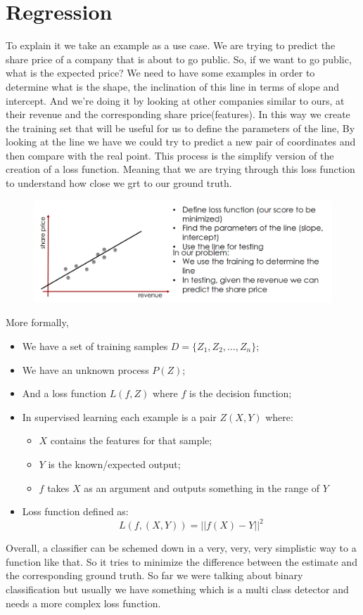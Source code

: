\section{Regression}
To explain it we take an example as a use case. We are trying to predict the share price of a company that is about to go public.
So, if we want to go public, what is the expected price? We need to have some examples in order to determine what is the shape, the inclination of this line in terms of slope and intercept.
And we're doing it by looking at other companies similar to ours, at their revenue and the corresponding share price(features).
In this way we create the training set that will be useful for us to define the parameters of the line,
By looking at the line we have we could try to predict a new pair of coordinates and then compare with the real point. This process is the simplify version of the creation of a loss function.
Meaning that we are trying through this loss function to understand how close we grt to our ground truth.
\begin{figure}[h]
    \centering
    \includegraphics[scale=0.4]{Figures/Regression.png}
\end{figure}
More formally,
\begin{itemize}
    \item We have a set of training samples $D=\{Z_1, Z_2, …, Z_n\}$;
    \item We have an unknown process $P(Z)$;
    \item And a loss function $L(f,Z)$ where $f$ is the decision function;
    \item In supervised learning each example is a pair $Z(X,Y)$ where:
        \begin{itemize}
            \item $X$ contains the features for that sample;
            \item $Y$ is the known/expected output;
            \item $f$ takes $X$ as an argument and outputs something in the range of $Y$
        \end{itemize}
    \item Loss function defined as:\[ L(f, (X,Y))=||f(X)-Y||^2\]
\end{itemize}
Overall, a classifier can be schemed down in a very, very, very simplistic way to a function like that. So it tries to minimize the difference between the estimate and the corresponding ground truth.
So far we were talking about binary classification but usually we have something which is a multi class detector and needs a more complex loss function.

